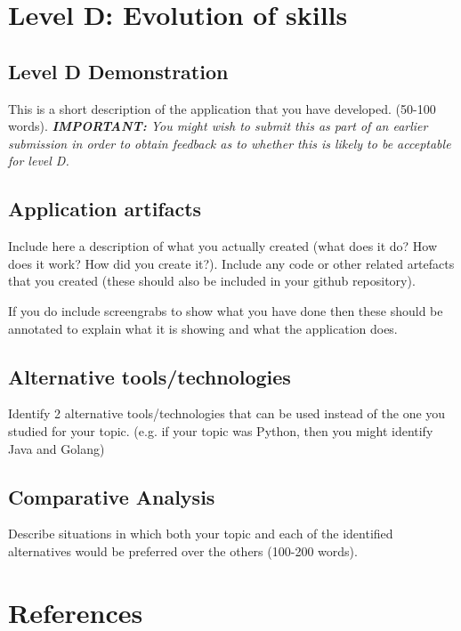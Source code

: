 \documentclass[a4paper, 11pt]{report}
\begin{document}

\newpage
\section{Level D: Evolution of skills}
\vspace{5mm}
\subsection{Level D Demonstration}

This is a short description of the application that you have developed. (50-100 words).
\textit{{\bf IMPORTANT:} You might wish to submit this as part of an earlier submission in order to obtain feedback as to whether this is likely to be acceptable for level D.}

\subsection{Application artifacts}

Include here a description of what you actually created (what does it do? How does it work? How did you create it?). Include any code or other related artefacts that you created (these should also be included in your github repository).

If you do include screengrabs to show what you have done then these should be annotated to explain what it is showing and what the application does.

\subsection{Alternative tools/technologies}
Identify 2 alternative tools/technologies that can be used instead of the one you studied for your topic. (e.g. if your topic was Python, then you might identify Java and Golang)
\subsection{Comparative Analysis}
Describe situations in which both your topic and each of the identified alternatives would be preferred over the others (100-200 words).




\newpage
\section{References}

\cite{HubSpot}
\cite{W3Schools}
\cite{YouTube}



\end{document}
